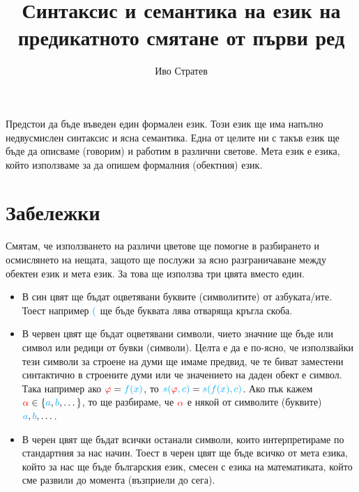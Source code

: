 \documentclass{article}[12pt]
\title{Синтаксис и семантика на език на предикатното смятане от първи ред}
\author{Иво Стратев}
\begin{document}
\maketitle

\tableofcontents

\vspace{1cm}

Предстои да бъде въведен един формален език.
Този език ще има напълно недвусмислен синтаксис и ясна семантика.
Една от целите ни с такъв език ще бъде да описваме (говорим) и работим в различни светове.
Мета език е езика, който използваме за да опишем формалния (обектния) език.

\section{Забележки}

Смятам, че използването на различи цветове ще помогне в разбирането и осмислянето на нещата,
защото ще послужи за ясно разграничаване между обектен език и мета език.
За това ще използва три цвята вместо един.

\begin{itemize}
\item В \color{cyan}син \color{black}цвят ще бъдат оцветявани буквите (символитите) от азбуката/ите.
Тоест например \(\color{cyan}{(}\) ще бъде буквата лява отваряща кръгла скоба.
\item В \color{red}червен \color{black}цвят ще бъдат оцветявани символи,
чието значние ще бъде или символ или редици от бувки (символи).
Целта е да е по-ясно, че използвайки тези символи за строене на думи ще имаме предвид,
че те биват заместени синтактично в строените думи или че значението на даден обект е символ.
Така например ако \(\color{red}\varphi \color{black}= \color{cyan}f(x)\),
то \(\color{cyan}s(\color{red}\varphi\color{cyan}, c) \color{black} = \color{cyan} s(f(x), c)\).
Ако пък кажем \(\color{red} \alpha \color{black} \in \{ \color{cyan} a \color{black}, \color{cyan} b \color{black}, \dots \} \),
то ще разбираме, че \(\color{red} \alpha\) е някой от символите (буквите) \(\color{cyan} a \color{black} , \color{cyan} b \color{black}, \dots\).
\item В черен цвят ще бъдат всички останали символи, които интерпретираме по стандартния за нас начин.
Тоест в черен цвят ще бъде всичко от мета езика, който за нас ще бъде българския език, смесен с езика на математиката,
който сме развили до момента (възприели до сега). 
\end{itemize}
\end{document}
